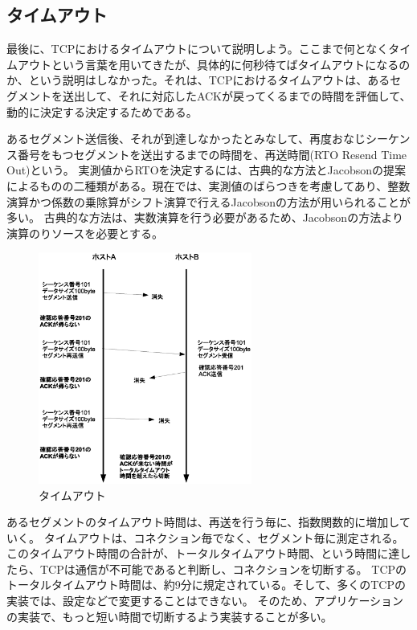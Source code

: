 \subsection{タイムアウト}



最後に、TCPにおけるタイムアウトについて説明しよう。ここまで何となくタイムアウトという言葉を用いてきたが、具体的に何秒待てばタイムアウトになるのか、という説明はしなかった。それは、TCPにおけるタイムアウトは、あるセグメントを送出して、それに対応したACKが戻ってくるまでの時間を評価して、動的に決定する決定するためである。

あるセグメント送信後、それが到達しなかったとみなして、再度おなじシーケンス番号をもつセグメントを送出するまでの時間を、再送時間(RTO Resend Time Out)という。
実測値からRTOを決定するには、古典的な方法とJacobsonの提案によるものの二種類がある。現在では、実測値のばらつきを考慮してあり、整数演算かつ係数の乗除算がシフト演算で行えるJacobsonの方法が用いられることが多い。
古典的な方法は、実数演算を行う必要があるため、Jacobsonの方法より演算のりソースを必要とする。

\begin{figure}
	\includegraphics[width=7cm, clip]{draw/tcp09n.eps}
	\caption{タイムアウト}
	\label{fig:tcp09}
\end{figure}

あるセグメントのタイムアウト時間は、再送を行う毎に、指数関数的に増加していく。
タイムアウトは、コネクション毎でなく、セグメント毎に測定される。
このタイムアウト時間の合計が、トータルタイムアウト時間、という時間に達したら、TCPは通信が不可能であると判断し、コネクションを切断する。
TCPのトータルタイムアウト時間は、約9分に規定されている。そして、多くのTCPの実装では、設定などで変更することはできない。
そのため、アプリケーションの実装で、もっと短い時間で切断するよう実装することが多い。

